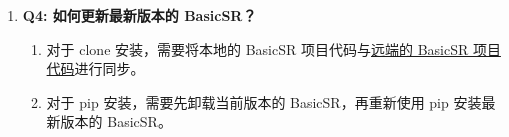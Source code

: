 \documentclass[../main.tex]{subfiles}
\begin{document}
\begin{enumerate}
\begin{enumerate}
    \item 如果先通过 pip 安装，随后通过本地 clone 安装，此时使用 pip list 查看 basicsr 路径：
    \begin{figure}[H]
	\begin{center}
		\texttt{[image: figures/pip-install-location.jpg]}
		\caption{basicsr 路径并未指向本地 clone 的 BasicSR}
		\label{fig:false-clone-install}
	\end{center}
	\vspace{-0.5cm}
    \end{figure}

    \item 如果先通过本地 clone 安装，随后通过 pip 安装，通过 pip list 查看此时 basicsr 路径：
    \begin{figure}[H]
	\begin{center}
		\texttt{[image: figures/clone-install-location.jpg]}
		\caption{basicsr 路径并未指向 python 环境下 (或者 anaconda) 下 的 BasicSR}
		\label{fig:false-pip-install}
	\end{center}
	\vspace{-0.5cm}
    \end{figure}

\end{enumerate}


    对于上述的两种错误情况 (图\ref{fig:false-clone-install}和图\ref{fig:false-pip-install})，此时正常的解决方式为：
\begin{verbatim}

pip uninstall basicsr

\end{verbatim}

    先将安装的 BasicSR 进行卸载，随后再根据项目的需要重新选择一种方式安装 BasicSR。

    \item \textbf{Q4: 如何更新最新版本的 BasicSR？}

\begin{enumerate}
    \item 对于 clone 安装，需要将本地的 BasicSR 项目代码与\href{https://github.com/XPixelGroup/BasicSR}{远端的 BasicSR 项目代码}进行同步。
    \item 对于 pip 安装，需要先卸载当前版本的 BasicSR，再重新使用 pip 安装最新版本的 BasicSR。
\end{enumerate}


\end{enumerate}
\end{document}
